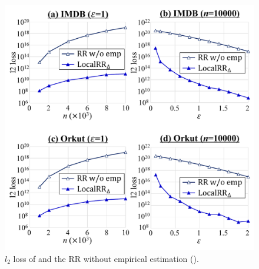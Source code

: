 
\begin{figure}[t]
\centering
\includegraphics[width=0.99\linewidth]{fig/res5_RR_wo_emp.pdf}
\vspace{-5mm}
\caption{$l_2$ loss of  and the RR without empirical estimation ().}
\label{fig:res5_RR_wo_emp}
\end{figure}

